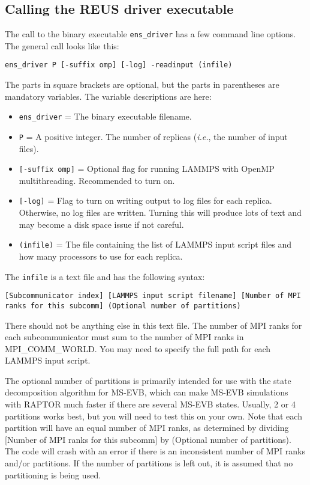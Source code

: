 \documentclass[10pt]{article}
\begin{document}
\subsection{Calling the REUS driver executable}\label{ssec:running_REUS}

The call to the binary executable \texttt{ens\_driver} has a few command line options.
The general call looks like this:
\begin{verbatim}
ens_driver P [-suffix omp] [-log] -readinput (infile)
\end{verbatim}
The parts in square brackets are optional, but the parts in parentheses are mandatory variables. 
The variable descriptions are here:
\begin{itemize}
\item	\texttt{ens\_driver} = The binary executable filename.
\item	\texttt{P} = A positive integer. 
		The number of replicas ({\em i.e.}, the number of input files).
\item	\texttt{[-suffix omp]} = Optional flag for running LAMMPS with OpenMP multithreading.
		Recommended to turn on.
\item	\texttt{[-log]} = Flag to turn on writing output to log files for each replica. Otherwise,
		no log files are written. Turning this will produce lots of text and may become a 
		disk space issue if not careful.
\item	\texttt{(infile)} = The file containing the list of LAMMPS input script files and how many
		processors to use for each replica.
\end{itemize}

The \texttt{infile} is a text file and has the following syntax:
\begin{verbatim}
[Subcommunicator index] [LAMMPS input script filename] [Number of MPI ranks for this subcomm] (Optional number of partitions)
\end{verbatim}
There should not be anything else in this text file. The number of MPI ranks
for each subcommunicator must sum to the number of MPI ranks in MPI\_COMM\_WORLD. You
may need to specify the full path for each LAMMPS input script.

The optional number of partitions is primarily intended for use with the state decomposition algorithm for MS-EVB, which
can make MS-EVB simulations with RAPTOR much faster if there are several MS-EVB states. Usually, 2 or 4 partitions works
best, but you will need to test this on your own. Note that each partition will have an equal number of MPI ranks, as determined
by dividing [Number of MPI ranks for this subcomm] by (Optional number of partitions). The code will crash with an error if
there is an inconsistent number of MPI ranks and/or partitions. If the number of partitions is left out, it is assumed that
no partitioning is being used.
\end{document}
